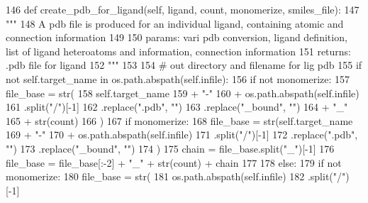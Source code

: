 \begin{DoxyCode}
146     \textcolor{keyword}{def }create\_pdb\_for\_ligand(self, ligand, count, monomerize, smiles\_file):
147         \textcolor{stringliteral}{"""}
148 \textcolor{stringliteral}{        A pdb file is produced for an individual ligand, containing atomic and connection information}
149 \textcolor{stringliteral}{}
150 \textcolor{stringliteral}{        params: vari pdb conversion, ligand definition, list of ligand heteroatoms and information,
       connection information}
151 \textcolor{stringliteral}{        returns: .pdb file for ligand}
152 \textcolor{stringliteral}{        """}
153 
154         \textcolor{comment}{# out directory and filename for lig pdb}
155         \textcolor{keywordflow}{if} \textcolor{keywordflow}{not} self.target\_name \textcolor{keywordflow}{in} os.path.abspath(self.infile):
156             \textcolor{keywordflow}{if} \textcolor{keywordflow}{not} monomerize:
157                 file\_base = str(
158                     self.target\_name
159                     + \textcolor{stringliteral}{"-"}
160                     + os.path.abspath(self.infile)
161                     .split(\textcolor{stringliteral}{"/"})[-1]
162                     .replace(\textcolor{stringliteral}{".pdb"}, \textcolor{stringliteral}{""})
163                     .replace(\textcolor{stringliteral}{"\_bound"}, \textcolor{stringliteral}{""})
164                     + \textcolor{stringliteral}{"\_"}
165                     + str(count)
166                 )
167             \textcolor{keywordflow}{if} monomerize:
168                 file\_base = str(self.target\_name
169                                 + \textcolor{stringliteral}{"-"}
170                                 + os.path.abspath(self.infile)
171                                 .split(\textcolor{stringliteral}{"/"})[-1]
172                                 .replace(\textcolor{stringliteral}{".pdb"}, \textcolor{stringliteral}{""})
173                                 .replace(\textcolor{stringliteral}{"\_bound"}, \textcolor{stringliteral}{""})
174                                 )
175                 chain = file\_base.split(\textcolor{stringliteral}{"\_"})[-1]
176                 file\_base = file\_base[:-2] + \textcolor{stringliteral}{"\_"} + str(count) + chain
177 
178         \textcolor{keywordflow}{else}:
179             \textcolor{keywordflow}{if} \textcolor{keywordflow}{not} monomerize:
180                 file\_base = str(
181                                 os.path.abspath(self.infile)
182                                 .split(\textcolor{stringliteral}{"/"})[-1]

\end{DoxyCode}
